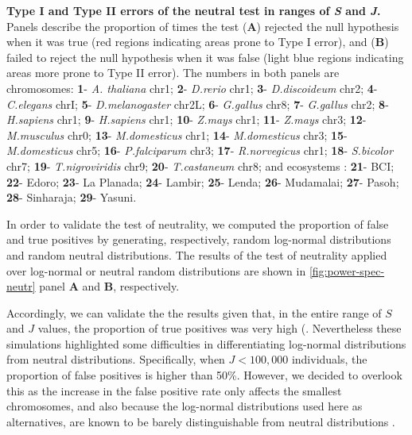\begin{PPfigure}
\caption[Type I and Type II errors of the neutral test in ranges of \textit{S} and \textit{J}]{
  {\bf Type I and Type II errors of the neutral test in ranges of \textit{S} and \textit{J}.}\\
  Panels describe the proportion of times the test (\textbf{A}) rejected the null hypothesis when it was true (red regions indicating areas prone to Type I error), and (\textbf{B}) failed to reject the null hypothesis when it was false (light blue regions indicating areas more prone to Type II error). The numbers in both panels are chromosomes:
  \textbf{1}- \textit{A. thaliana} chr1;
  \textbf{2}- \textit{D.rerio} chr1;
  \textbf{3}- \textit{D.discoideum} chr2;
  \textbf{4}- \textit{C.elegans} chrI;
  \textbf{5}- \textit{D.melanogaster} chr2L;
  \textbf{6}- \textit{G.gallus} chr8;
  \textbf{7}- \textit{G.gallus} chr2;
  \textbf{8}- \textit{H.sapiens} chr1;
  \textbf{9}- \textit{H.sapiens} chr1;
  \textbf{10}- \textit{Z.mays} chr1;
  \textbf{11}- \textit{Z.mays} chr3;
  \textbf{12}- \textit{M.musculus} chr0;
  \textbf{13}- \textit{M.domesticus} chr1;
  \textbf{14}- \textit{M.domesticus} chr3;
  \textbf{15}- \textit{M.domesticus} chr5;
  \textbf{16}- \textit{P.falciparum} chr3;
  \textbf{17}- \textit{R.norvegicus} chr1;
  \textbf{18}- \textit{S.bicolor} chr7;
  \textbf{19}- \textit{T.nigroviridis} chr9;
  \textbf{20}- \textit{T.castaneum} chr8; and ecosystems \cite{Jabot2011}:
  \textbf{21}- BCI;
  \textbf{22}- Edoro;
  \textbf{23}- La Planada;
  \textbf{24}- Lambir;
  \textbf{25}- Lenda;
  \textbf{26}- Mudamalai;
  \textbf{27}- Pasoh;
  \textbf{28}- Sinharaja;
  \textbf{29}- Yasuni.}
  \label{fig:power-spec-neutr}
\end{PPfigure}

In order to validate the test of neutrality, we computed the proportion of false and true positives by generating, respectively, random log-normal distributions and random neutral distributions. The results of the test of neutrality applied over log-normal or neutral random distributions are shown in \autoref{fig:power-spec-neutr} panel \textbf{A} and \textbf{B}, respectively.

Accordingly, we can validate the the results given that, in the entire range of $S$ and $J$ values, the proportion of true positives was very high (. Nevertheless these simulations highlighted some difficulties in differentiating log-normal distributions from neutral distributions. Specifically, when $J<100,000$ individuals, the proportion of false positives is higher than 50\%. However, we decided to overlook this as the increase in the false positive rate only affects the smallest chromosomes, and also because the log-normal distributions used here as alternatives, are known to be barely distinguishable from neutral distributions \cite{McGill2006}.

